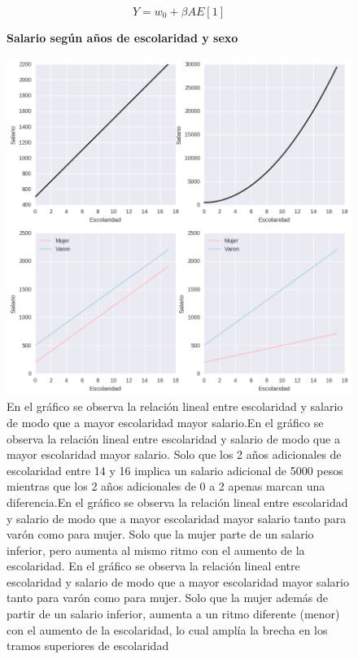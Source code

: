 $$Y = w_0 + \beta AE [1]$$ 

\begin{figure}[!h]
		\centering
		\textbf{Salario según años de escolaridad y sexo}\par\medskip
		\includegraphics[scale = 0.5]{../img/capitulo2/modelo.png}
		\caption{En el gráfico se observa la relación lineal entre escolaridad y salario de modo que a mayor escolaridad mayor salario.En el gráfico se observa la relación lineal entre escolaridad y salario de modo que a mayor escolaridad mayor salario. Solo que los 2 años adicionales de escolaridad entre 14 y 16 implica un salario adicional de 5000 pesos mientras que los 2 años adicionales de 0 a 2 apenas marcan una diferencia.En el gráfico se observa la relación lineal entre escolaridad y salario de modo que a mayor escolaridad mayor salario tanto para varón como para mujer. Solo que la mujer parte de un salario inferior, pero aumenta al mismo ritmo con el aumento de la escolaridad. En el gráfico se observa la relación lineal entre escolaridad y salario de modo que a mayor escolaridad mayor salario tanto para varón como para mujer. Solo que la mujer además de partir de un salario inferior, aumenta a un ritmo diferente (menor) con el aumento de la escolaridad, lo cual amplía la brecha en los tramos superiores de escolaridad}
\end{figure}

